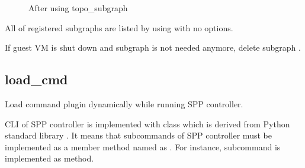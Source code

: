 \documentclass[a4paper,11pt,openany,oneside,english]{sphinxmanual}
\begin{document}
\begin{sphinxVerbatim}[commandchars=\\\{\},formatcom=\footnotesize]
\end{sphinxVerbatim}

\begin{figure}[htbp]
\centering
\capstart

\noindent{}
\caption{After using topo\_subgraph}\label{\detokenize{commands/experimental:id3}}\label{\detokenize{commands/experimental:figure-topo-subg-after}}\end{figure}

All of registered subgraphs are listed by using 
with no options.

\begin{sphinxVerbatim}[commandchars=\\\{\},formatcom=\footnotesize]
\end{sphinxVerbatim}

If guest VM is shut down and subgraph is not needed anymore,
delete subgraph .

\begin{sphinxVerbatim}[commandchars=\\\{\},formatcom=\footnotesize]
\end{sphinxVerbatim}


\subsection{load\_cmd}
\label{\detokenize{commands/experimental:load-cmd}}\label{\detokenize{commands/experimental:commands-experimental-load-cmd}}
Load command plugin dynamically while running SPP controller.

\begin{sphinxVerbatim}[commandchars=\\\{\},formatcom=\footnotesize]
\end{sphinxVerbatim}

CLI of SPP controller is implemented with  class which is
derived from Python standard library .
It means that subcommands of SPP controller must be implemented as
a member method named as .
For instance,  subcommand is implemented as 
method.
\end{document}
